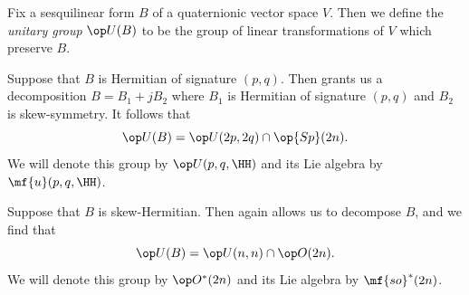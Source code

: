 \documentclass[../notes.tex]{subfiles}
\begin{document}
\begin{definition}
	Fix a sesquilinear form $B$ of a quaternionic vector space $V$. Then we define the \textit{unitary group} $\op U(B)$ to be the group of linear transformations of $V$ which preserve $B$.
\end{definition}
\begin{example}
	Suppose that $B$ is Hermitian of signature $(p,q)$. Then  grants us a decomposition $B=B_1+jB_2$ where $B_1$ is Hermitian of signature $(p,q)$ and $B_2$ is skew-symmetry. It follows that
	\[\op U(B)=\op U(2p,2q)\cap\op{Sp}(2n).\]
	We will denote this group by $\op U(p,q,\HH)$ and its Lie algebra by $\mf{u}(p,q,\HH)$.
\end{example}
\begin{example}
	Suppose that $B$ is skew-Hermitian. Then  again allows us to decompose $B$, and we find that
	\[\op U(B)=\op U(n,n)\cap\op O(2n).\]
	We will denote this group by $\op O^*(2n)$ and its Lie algebra by $\mf{so}^*(2n)$.
\end{example}
\end{document}
